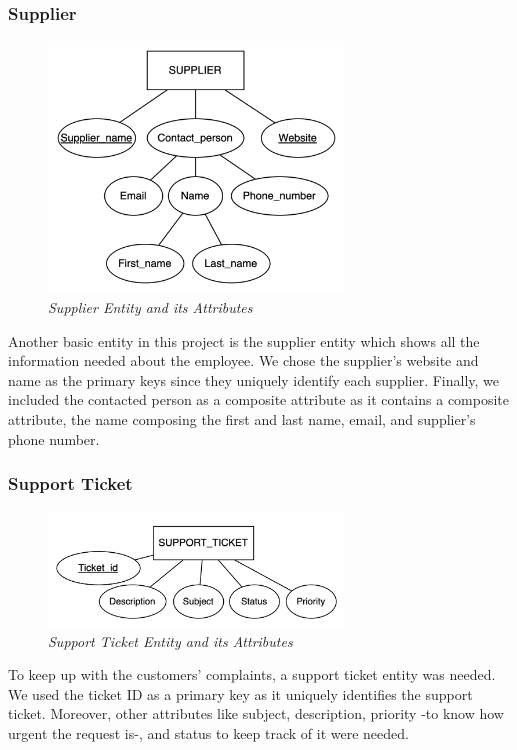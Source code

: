 \subsubsection{Supplier}
\begin{figure}[H]
  \centering
  \includegraphics[width=0.7\textwidth]{images/entities/supplier.png}
  \caption{\textit{Supplier Entity and its Attributes}}
\end{figure}

Another basic entity in this project is the supplier entity which shows all the information needed about the employee. We chose the supplier's website and name as the primary keys since they uniquely identify each supplier. Finally, we included the contacted person as a composite attribute as it contains a composite attribute, the name composing the first and last name, email, and supplier's phone number.

\subsubsection{Support Ticket}
\begin{figure}[H]
  \centering
  \includegraphics[width=0.7\textwidth]{images/entities/support_ticket.png}
  \caption{\textit{Support Ticket Entity and its Attributes}}
\end{figure}

To keep up with the customers' complaints, a support ticket entity was needed. We used the ticket ID as a primary key as it uniquely identifies the support ticket. Moreover, other attributes like subject, description, priority -to know how urgent the request is-, and status to keep track of it were needed.


